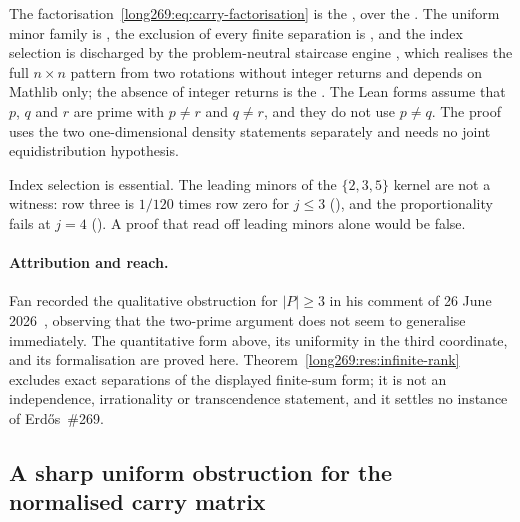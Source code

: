 \documentclass[11pt]{article}
\begin{document}
\noindent The factorisation~\eqref{long269:eq:carry-factorisation} is the
, over the
.  The uniform minor family is
,
the exclusion of every finite separation is
,
and the index selection is discharged by the problem-neutral staircase engine
,
which realises the full $n\times n$ pattern from two rotations without integer
returns and depends on Mathlib only; the absence of integer returns is the
.  The Lean forms assume that $p$,
$q$ and $r$ are prime with $p\ne r$ and $q\ne r$, and they do not use $p\ne q$.
The proof uses the two one-dimensional density statements separately and needs
no joint equidistribution hypothesis.

Index selection is essential.  The leading minors of the
$\{2,3,5\}$ kernel are not a witness: row three is $1/120$ times row zero for
$j\le3$
(),
and the proportionality fails at $j=4$
().
A proof that read off leading minors alone would be false.

\paragraph{Attribution and reach.}
Fan recorded the qualitative obstruction for $|P|\ge3$ in his comment of
26 June 2026~\cite{fan2026comment}, observing that the two-prime argument does
not seem to generalise immediately.  The quantitative form above, its
uniformity in the third coordinate, and its formalisation are proved here.
Theorem~\ref{long269:res:infinite-rank} excludes exact separations of the displayed
finite-sum form; it is not an independence, irrationality or transcendence
statement, and it settles no instance of Erd\H{o}s~\#269.

\subsection{A sharp uniform obstruction for the normalised carry matrix}
\end{document}
